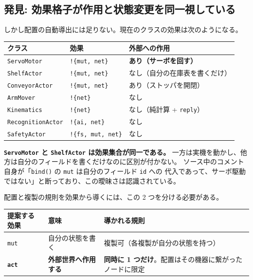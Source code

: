 \documentclass[11pt,a4paper]{article}
\newcommand{\code}[1]{\texttt{#1}}
\newcommand{\prob}[1]{\textbf{\textcolor{red!55!black}{#1}}}
\newcommand{\good}[1]{\textbf{\textcolor{green!45!black}{#1}}}
\begin{document}
\subsection{発見: 効果格子が作用と状態変更を同一視している}

しかし配置の自動導出には足りない。現在のクラスの効果は次のようになる。

\begin{center}\small
\begin{tabular}{@{}l l l@{}}
\toprule
\textbf{クラス} & \textbf{効果} & \textbf{外部への作用}\\
\midrule
\code{ServoMotor}       & \code{!\{mut, net\}} & \good{あり（サーボを回す）}\\
\code{ShelfActor}       & \code{!\{mut, net\}} & なし（自分の在庫表を書くだけ）\\
\code{ConveyorActor}    & \code{!\{mut, net\}} & あり（ストッパを開閉）\\
\code{ArmMover}         & \code{!\{net\}}      & なし\\
\code{Kinematics}       & \code{!\{net\}}      & なし（純計算 + \code{reply}）\\
\code{RecognitionActor} & \code{!\{ai, net\}}  & なし\\
\code{SafetyActor}      & \code{!\{fs, mut, net\}} & なし\\
\bottomrule
\end{tabular}
\end{center}

\prob{\code{ServoMotor} と \code{ShelfActor} は効果集合が同一である。}
一方は実機を動かし、他方は自分のフィールドを書くだけなのに区別が付かない。
ソース中のコメント自身が「\code{bind()} の \code{mut} は自分のフィールド \code{id} への
代入であって、サーボ駆動ではない」と断っており、この曖昧さは認識されている。

配置と複製の規則を効果から導くには、この 2 つを分ける必要がある。

\begin{center}\small
\begin{tabularx}{\textwidth}{@{}l l X@{}}
\toprule
\textbf{提案する効果} & \textbf{意味} & \textbf{導かれる規則}\\
\midrule
\code{mut} & 自分の状態を書く & 複製可（各複製が自分の状態を持つ）\\
\good{\code{act}} & \textbf{外部世界へ作用する} & \prob{同時に 1 つだけ}。配置はその機器に繋がったノードに限定\\
\bottomrule
\end{tabularx}
\end{center}
\end{document}

